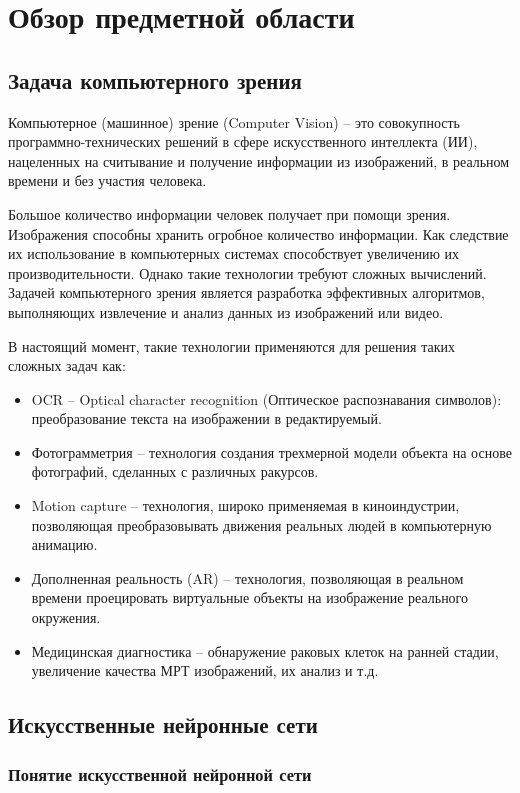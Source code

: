 \section{Обзор предметной области}
\subsection{Задача компьютерного зрения}
Компьютерное (машинное) зрение (Computer Vision) – это совокупность программно-технических решений в сфере искусственного интеллекта (ИИ), нацеленных на считывание и получение информации из изображений, в реальном времени и без участия человека. 

Большое количество информации человек получает при помощи зрения. 
Изображения способны хранить огробное количество информации. Как следствие их использование в компьютерных системах способствует увеличению их производительности. Однако такие технологии требуют сложных вычислений. Задачей компьютерного зрения является разработка эффективных алгоритмов, выполняющих извлечение и анализ данных из изображений или видео. 
 
В настоящий момент, такие технологии применяются для решения таких сложных задач как:
\begin{itemize}
    \item OCR – Optical character recognition (Оптическое распознавания символов): преобразование текста на изображении в редактируемый.
    \item Фотограмметрия – технология создания трехмерной модели объекта на основе фотографий, сделанных с различных ракурсов.
    \item Motion capture – технология, широко применяемая в киноиндустрии, позволяющая преобразовывать движения реальных людей в компьютерную анимацию.
    \item Дополненная реальность (AR) – технология, позволяющая в реальном времени проецировать виртуальные объекты на изображение реального окружения. 
    \item Медицинская диагностика – обнаружение раковых клеток на ранней стадии, увеличение качества МРТ изображений, их анализ и т.д.
\end{itemize}
\subsection{Искусственные нейронные сети}

\subsubsection{Понятие искусственной нейронной сети}


